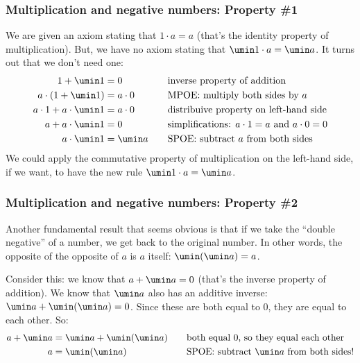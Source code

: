 \subsubsection{Multiplication and negative numbers: Property \#1}

We are given an axiom stating that $1 \cdot a = a$ (that's the identity property of multiplication). But, we have no axiom stating that $\umin1 \cdot a = \umin a$. It turns out that we don't need one:
\[\begin{aligned}
1 + \umin1 &= 0
&& \quad\text{inverse property of addition}
\\
a\cdot(1+\umin1) &= a\cdot0
&& \quad\text{MPOE: multiply both sides by $a$}
\\
a\cdot1 + a\cdot\umin1 &= a\cdot0
&& \quad\text{distribuive property on left-hand side}
\\
a + a\cdot\umin1 &= 0
&& \quad\text{simplifications: $a\cdot1 = a$ and $a\cdot0 = 0$}
\\
a\cdot\umin1 &= \umin a
&& \quad\text{SPOE: subtract $a$ from both sides}
\end{aligned}\]
We could apply the commutative property of multiplication on the left-hand side, if we want, to have the new rule $\umin1 \cdot a = \umin a$.

\subsubsection{Multiplication and negative numbers: Property \#2}
Another fundamental result that seems obvious is that if we take the ``double negative'' of a number, we get back to the original number. In other words, the opposite of the opposite of $a$ is $a$ itself: $\umin(\umin a) = a$.

Consider this: we know that $a + \umin a = 0$ (that's the inverse property of addition). We know that $\umin a$ also has an additive inverse: $\umin a + \umin(\umin a) = 0$. Since these are both equal to 0, they are equal to each other. So:
\[\begin{aligned}
a + \umin a &= \umin a + \umin(\umin a)
&& \quad\text{both equal 0, so they equal each other}
\\
a &= \umin(\umin a)
&& \quad\text{SPOE: subtract $\umin a$ from both sides!}
\end{aligned}\]

